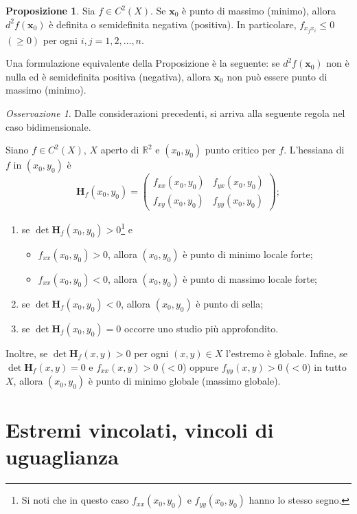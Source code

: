 \documentclass[a4paper]{book}
\numberwithin{equation}{section}
\theoremstyle{plain}
\theoremstyle{definition}
\newtheorem{prop}{Proposizione}[section]
\theoremstyle{remark}
\newtheorem{oss}{Osservazione}[section]
\renewcommand{\vec}{\boldsymbol}
\theoremstyle{example}
\begin{document}
\begin{prop}
Sia $f \in C^2(X)$. Se $\vec{x}_0$ è punto di massimo (minimo), allora $d^2f(\vec{x}_0)$ è definita o semidefinita negativa (positiva). In particolare, $f_{x_jx_i} \le 0$ $(\ge 0)$ per ogni $i,j = 1, 2, \dots, n$.
\end{prop}

Una formulazione equivalente della Proposizione è la seguente: se $d^2f(\vec{x}_0)$ non è nulla ed è semidefinita positiva (negativa), allora $\vec{x}_0$ non può essere punto di massimo (minimo).

\begin{oss} Dalle considerazioni precedenti, si arriva alla seguente regola nel caso bidimensionale.

Siano $f \in C^2(X)$, $X$ aperto di $\mathbb{R}^2$ e $(x_0, y_0)$ punto critico per $f$. L'hessiana di $f$ in $(x_0, y_0)$ è
	\begin{equation*}
	\mathbf{H}_f(x_0, y_0) = \begin{pmatrix} f_{xx}(x_0, y_0) & f_{yx}(x_0, y_0) \\ f_{xy}(x_0, y_0) & f_{yy}(x_0, y_0) \end{pmatrix};
	\end{equation*}
\begin{enumerate}
\item se $\det{\mathbf{H}_f(x_0, y_0)} > 0$\footnote{Si noti che in questo caso $f_{xx}(x_0, y_0)$ e $f_{yy}(x_0, y_0)$ hanno lo stesso segno.} e
	\begin{itemize}
	\item $f_{xx}(x_0, y_0) > 0$, allora $(x_0, y_0)$ è punto di minimo locale forte;
	\item $f_{xx}(x_0, y_0) < 0$, allora $(x_0, y_0)$ è punto di massimo locale forte;
	\end{itemize}
\item se $\det{\mathbf{H}_f(x_0, y_0)} < 0$, allora $(x_0, y_0)$ è punto di sella;
\item se $\det{\mathbf{H}_f(x_0, y_0)} = 0$ occorre uno studio più approfondito.
\end{enumerate}
Inoltre, se $\det{\mathbf{H}_f(x, y)} > 0$ per ogni $(x, y) \in X$ l'estremo è globale. Infine, se $\det{\mathbf{H}_f(x, y)} = 0$ e $f_{xx}(x,y) > 0$ ($< 0$) oppure $f_{yy}(x,y) > 0$ ($< 0$) in tutto $X$, allora $(x_0, y_0)$ è punto di minimo globale (massimo globale).
\end{oss}

\section{Estremi vincolati, vincoli di uguaglianza}
\end{document}
